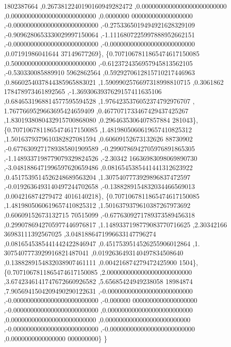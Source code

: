 \begin{DoxyCode}
      1802387664 ,0.2673812240190160949282472 ,0.0000000000000000000000000 ,0.0000000000000000000000000 ,0.0000000
      000000000000000000 ,-0.0000000000000000000000000 ,-0.2753365019494921628329109 ,-0.9096280653330029997150064
       ,-1.1116807225997888952662151 ,-0.0000000000000000000000000 ,-0.0000000000000000000000000 ,0.07191986041644
      37149677269\},
\{0.7071067811865474617150085 ,0.5000000000000000000000000 ,-0.6123724356957945813562105 ,-0.530330085889910
      5962862564 ,0.5929270612815710217446963 ,0.8660254037844385965883021 ,1.5909902576697318998810715 ,0.3061862
      178478973461892565 ,-1.3693063937629157411635106 ,0.6846531968814577595594528 ,1.9764235376052374792976707 ,
      1.7677669529663695424659409 ,0.4677071733467429437425267 ,1.8301938080432915700868080 ,0.2964635306407857884
      281043\},
\{0.7071067811865474617150085 ,1.4819805060619657410825312 ,1.5016379379610382827081594 ,0.60609152673132626
      88730902 ,-0.6776309271789385801909589 ,-0.2990786942705976891865305 ,-1.1489337198779079329824526 ,-2.30342
      16636983098069890730 ,-3.0481886471996597620659486 ,0.0816545385441441312623922 ,0.4517539514526248689563204
       ,1.3075407773929896837472597 ,-0.0192636493140497244702658 ,-0.1388289154832034466569013 ,0.004216874279472
      4016140218\},
\{0.7071067811865474617150085 ,1.4819805060619657410825312 ,1.5016379379610387267973692 ,0.60609152673132715
      70515099 ,-0.6776309271789373589456318 ,0.2990786942705977446976817 ,1.1489337198779083770716625 ,2.30342166
      36983111392567025 ,3.0481886471996633147796274 ,0.0816545385441442422846947 ,0.4517539514526255906012864 ,1.
      3075407773929916821487041 ,0.0192636493140497834508640 ,0.1388289154832038907461111 ,0.004216874279472425900
      1504\},
\{0.7071067811865474617150085 ,2.0000000000000000000000000 ,3.6742346141747672660926582 ,5.65685424949238058
      18984874 ,7.9056941504209490290122631 ,-0.0000000000000000000000000 ,-0.0000000000000000000000000 ,-0.000000
      0000000000000000000 ,-0.0000000000000000000000000 ,0.0000000000000000000000000 ,0.0000000000000000000000000 
      ,0.0000000000000000000000000 ,-0.0000000000000000000000000 ,-0.0000000000000000000000000 ,0.0000000000000000
      000000000\}
\}
\end{DoxyCode}
\mbox{\label{a00455_a0eb27341e5fef6e91e1d23382d285028}} 
